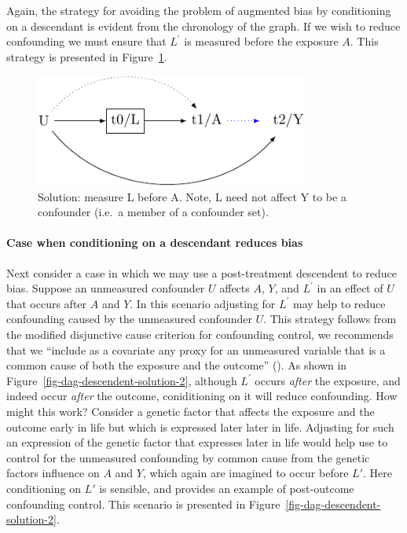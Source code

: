 \documentclass[
  singlecolumn,
  9pt]{article}
\let\oldparagraph\paragraph
\renewcommand{\paragraph}[1]{\oldparagraph{#1}\mbox{}}
\begin{document}
Again, the strategy for avoiding the problem of augmented bias by
conditioning on a descendant is evident from the chronology of the
graph. If we wish to reduce confounding we must ensure that \(L^\prime\)
is measured before the exposure \(A\). This strategy is presented in
Figure~\ref{fig-dag-descendent-solution}.

\begin{figure}

{\centering \includegraphics[width=0.8\textwidth,height=\textheight]{causal-dags_files/figure-pdf/fig-dag-descendent-solution-1.pdf}

}

\caption{\label{fig-dag-descendent-solution}Solution: measure L before
A. Note, L need not affect Y to be a confounder (i.e.~a member of a
confounder set).}

\end{figure}

\paragraph{Case when conditioning on a descendant reduces
bias}\label{case-when-conditioning-on-a-descendant-reduces-bias}

Next consider a case in which we may use a post-treatment descendent to
reduce bias. Suppose an unmeasured confounder \(U\) affects \(A\),
\(Y\), and \(L^\prime\) in an effect of \(U\) that occurs after \(A\)
and \(Y\). In this scenario adjusting for \(L^\prime\) may help to
reduce confounding caused by the unmeasured confounder \(U\). This
strategy follows from the modified disjunctive cause criterion for
confounding control, we recommends that we ``include as a covariate any
proxy for an unmeasured variable that is a common cause of both the
exposure and the outcome'' (). As shown in Figure~\ref{fig-dag-descendent-solution-2}, although
\(L^\prime\) occurs \emph{after} the exposure, and indeed occur
\emph{after} the outcome, coniditioning on it will reduce confounding.
How might this work? Consider a genetic factor that affects the exposure
and the outcome early in life but which is expressed later later in
life. Adjusting for such an expression of the genetic factor that
expresses later in life would help use to control for the unmeasured
confounding by common cause from the genetic factors influence on \(A\)
and \(Y\), which again are imagined to occur before \(L'\). Here
conditioning on \(L'\) is sensible, and provides an example of
post-outcome confounding control. This scenario is presented in
Figure~\ref{fig-dag-descendent-solution-2}.
\end{document}
